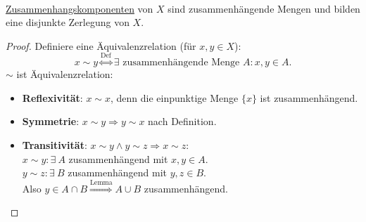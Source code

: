 \begin{remark}
  \ \\ \hyperref[def:zusammenhangskomponente]{Zusammenhangskomponenten} von $ X $ sind zusammenhängende Mengen und bilden eine disjunkte Zerlegung von $ X $.
  \begin{proof}
    Definiere eine Äquivalenzrelation (für $ x, y \in X $):
    \begin{equation*}
      x \sim y \overset{\text{Def}}{\Leftrightarrow} \exists \text{ zusammenhängende Menge } A : x, y \in A\text{.}
    \end{equation*}
    $ \sim $ ist Äquivalenzrelation:
    \begin{itemize}
      \item \textbf{Reflexivität}: $ x \sim x $, denn die einpunktige Menge $ \{ x \} $ ist zusammenhängend. 
      \item \textbf{Symmetrie}: $ x \sim y \Rightarrow y \sim x $ nach Definition.
      \item \textbf{Transitivität}: $ x \sim y \wedge y \sim z \Rightarrow x \sim z $: \\
        $ x \sim y: \exists \ A $ zusammenhängend mit $ x,y \in A $. \\
        $ y \sim z: \exists \ B $ zusammenhängend mit $ y,z \in B $. \\
        Also $ y \in A \cap B \overset{\text{Lemma}}{\Rightarrow} A \cup B $ zusammenhängend.
    \end{itemize}
  \end{proof}
\end{remark}

